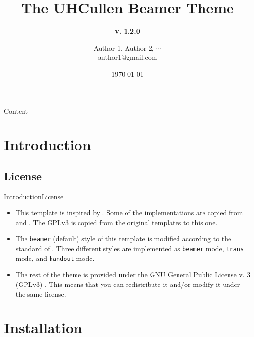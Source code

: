 \documentclass[10pt,xcolor={dvipsnames},aspectratio=169]{beamer}
\title[UHCullen Theme]
{ %
  \textbf{The UHCullen Beamer Theme}
}
\subtitle[v. 1.2.0]
{
\textbf{v. 1.2.0}
}
\author[Author 1]
{Author 1\texorpdfstring{\footnotemark[1]}{},
Author 2\texorpdfstring{\footnotemark[2]}{},
\texorpdfstring{$\cdots$}{...}
\texorpdfstring{ \\
  {\ttfamily author1@gmail.com}
}{}}
\institute[]
{%
  \footnotemark[1]Affiliation 1\\
  \footnotemark[2]Affiliation 2
}
\date{\today} %
\begin{document}

\titleframe

\begin{frame}{Content}{}
\tableofcontents
\end{frame}

\section{Introduction}
\subsection{License}
\begin{frame}{Introduction}{License}

  \begin{itemize}
    \item<1-> This template is inspired by . Some of the implementations are copied from  and . The GPLv3 is copied from the original templates to this one.
    \item<2-> The \texttt{beamer} (default) style of this template is modified according to the standard of . Three different styles are implemented as \texttt{beamer} mode, \texttt{trans} mode, and \texttt{handout} mode.
    \item<3-> The rest of the theme is provided under the GNU General Public License v. 3 (GPLv3) . This means that you can redistribute it and/or modify it under the same license. 
  \end{itemize}
\end{frame}

\section{Installation}
\end{document}
